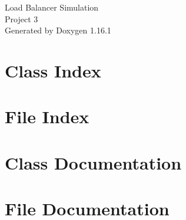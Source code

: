\documentclass[twoside]{book}
\newcommand{\+}{\discretionary{\mbox{\scriptsize$\hookleftarrow$}}{}{}}
\newcommand{\clearemptydoublepage}{%
    \newpage{\pagestyle{empty}\cleardoublepage}%
  }
\begin{document}
  \raggedbottom
    \hypersetup{pageanchor=false,
                bookmarksnumbered=true,
                pdfencoding=unicode
               }
  \begin{titlepage}
  \vspace*{7cm}
  \begin{center}%
  {\Large Load Balancer Simulation}\\
  [1ex]\large Project 3 \\
  \vspace*{1cm}
  {\large Generated by Doxygen 1.16.1}\\
  \end{center}
  \end{titlepage}
  \clearemptydoublepage
  \tableofcontents
  \clearemptydoublepage
  \hypersetup{pageanchor=true}

\chapter{Class Index}

\chapter{File Index}

\chapter{Class Documentation}





\chapter{File Documentation}























  \backmatter
  \newpage
  \clearemptydoublepage
  \printindex
\end{document}
